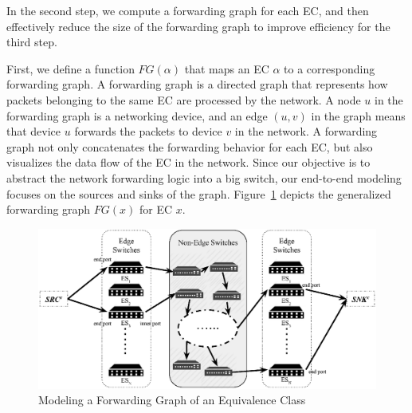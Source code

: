 \label{OBS:Sec:GenerateFG}

In the second step, we compute a forwarding graph for each EC, and then effectively reduce the size of the forwarding graph to improve efficiency for the third step.

First, we define a function $FG(\alpha)$ that maps an EC $\alpha$ to a corresponding forwarding graph. A forwarding graph is a directed graph that represents how packets belonging to the same EC are processed by the network. A node $u$ in the forwarding graph is a networking device, and an edge $(u, v)$ in the graph means that device $u$ forwards the packets to device $v$ in the network.
A forwarding graph not only concatenates the forwarding behavior for each EC, but also visualizes the data flow of the EC in the network.
Since our objective is to abstract the network forwarding logic into a big switch, our end-to-end modeling focuses on the sources and sinks of the graph.
Figure~\ref{OBS:Fig:ForwardingGraphECX} depicts the generalized forwarding graph $FG(x)$ for EC $x$.


\begin{figure}[ht]
\centering
\includegraphics[scale=0.9\textwidth]{OneBigSwitch/figures/ForwardingGraph.eps}
\caption{Modeling a Forwarding Graph of an Equivalence Class}
\label{OBS:Fig:ForwardingGraphECX}
\end{figure}

